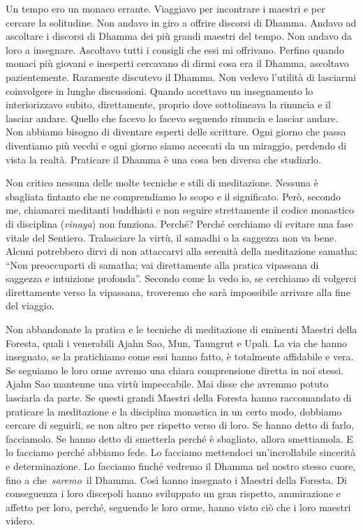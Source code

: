 Un tempo ero un monaco errante. Viaggiavo per incontrare i maestri e per
cercare la solitudine. Non andavo in giro a offrire discorsi di Dhamma.
Andavo ad ascoltare i discorsi di Dhamma dei più grandi maestri del
tempo. Non andavo da loro a insegnare. Ascoltavo tutti i consigli che
essi mi offrivano. Perfino quando monaci più giovani e inesperti
cercavano di dirmi cosa era il Dhamma, ascoltavo pazientemente.
Raramente discutevo il Dhamma. Non vedevo l'utilità di lasciarmi
coinvolgere in lunghe discussioni. Quando accettavo un insegnamento lo
interiorizzavo subito, direttamente, proprio dove sottolineava la
rinuncia e il lasciar andare. Quello che facevo lo facevo seguendo
rinuncia e lasciar andare. Non abbiamo bisogno di diventare esperti
delle scritture. Ogni giorno che passa diventiamo più vecchi e ogni
giorno siamo accecati da un miraggio, perdendo di vista la realtà.
Praticare il Dhamma è una cosa ben diversa che studiarlo.

Non critico nessuna delle molte tecniche e stili di meditazione. Nessuna
è sbagliata fintanto che ne comprendiamo lo scopo e il significato.
Però, secondo me, chiamarci meditanti buddhisti e non seguire
strettamente il codice monastico di disciplina (\emph{vinaya}) non
funziona. Perché? Perché cerchiamo di evitare una fase vitale del
Sentiero. Tralasciare la virtù, il samadhi o la saggezza non va bene.
Alcuni potrebbero dirvi di non attaccarvi alla serenità della
meditazione samatha: ``Non preoccuparti di samatha; vai direttamente
alla pratica vipassana di saggezza e intuizione profonda''. Secondo come
la vedo io, se cerchiamo di volgerci direttamente verso la vipassana,
troveremo che sarà impossibile arrivare alla fine del viaggio.

Non abbandonate la pratica e le tecniche di meditazione di eminenti
Maestri della Foresta, quali i venerabili Ajahn Sao, Mun, Taungrut e
Upali. La via che hanno insegnato, se la pratichiamo come essi hanno
fatto, è totalmente affidabile e vera. Se seguiamo le loro orme avremo
una chiara comprensione diretta in noi stessi. Ajahn Sao mantenne una
virtù impeccabile. Mai disse che avremmo potuto lasciarla da parte. Se
questi grandi Maestri della Foresta hanno raccomandato di praticare la
meditazione e la disciplina monastica in un certo modo, dobbiamo cercare
di seguirli, se non altro per rispetto verso di loro. Se hanno detto di
farlo, facciamolo. Se hanno detto di smetterla perché è sbagliato,
allora smettiamola. E lo facciamo perché abbiamo fede. Lo facciamo
mettendoci un'incrollabile sincerità e determinazione. Lo facciamo
finché vedremo il Dhamma nel nostro stesso cuore, fino a
che~\emph{saremo}~il Dhamma. Così hanno insegnato i Maestri della
Foresta. Di conseguenza i loro discepoli hanno sviluppato un gran
rispetto, ammirazione e affetto per loro, perché, seguendo le loro orme,
hanno visto ciò che i loro maestri videro.


